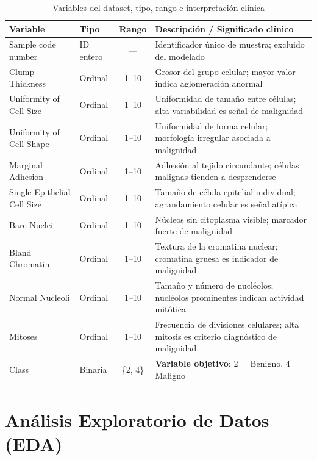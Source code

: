 \documentclass[11pt,a4paper]{article}
\begin{document}
\begin{table}[H]
\centering
\caption{Variables del dataset, tipo, rango e interpretación clínica}
\renewcommand{\arraystretch}{1.2}
\begin{tabularx}{\textwidth}{l l c X}
\toprule
\textbf{Variable} & \textbf{Tipo} & \textbf{Rango} & \textbf{Descripción / Significado clínico} \\
\midrule
\rowcolor{lightgray}
Sample code number & ID entero & --- & Identificador único de muestra; excluido del modelado \\
Clump Thickness & Ordinal & 1--10 & Grosor del grupo celular; mayor valor indica aglomeración anormal \\
\rowcolor{lightgray}
Uniformity of Cell Size & Ordinal & 1--10 & Uniformidad de tamaño entre células; alta variabilidad es señal de malignidad \\
Uniformity of Cell Shape & Ordinal & 1--10 & Uniformidad de forma celular; morfología irregular asociada a malignidad \\
\rowcolor{lightgray}
Marginal Adhesion & Ordinal & 1--10 & Adhesión al tejido circundante; células malignas tienden a desprenderse \\
Single Epithelial Cell Size & Ordinal & 1--10 & Tamaño de célula epitelial individual; agrandamiento celular es señal atípica \\
\rowcolor{lightgray}
Bare Nuclei & Ordinal & 1--10 & Núcleos sin citoplasma visible; marcador fuerte de malignidad \\
Bland Chromatin & Ordinal & 1--10 & Textura de la cromatina nuclear; cromatina gruesa es indicador de malignidad \\
\rowcolor{lightgray}
Normal Nucleoli & Ordinal & 1--10 & Tamaño y número de nucléolos; nucléolos prominentes indican actividad mitótica \\
Mitoses & Ordinal & 1--10 & Frecuencia de divisiones celulares; alta mitosis es criterio diagnóstico de malignidad \\
\rowcolor{lightgray}
Class & Binaria & \{2, 4\} & \textbf{Variable objetivo}: 2 = Benigno, 4 = Maligno \\
\bottomrule
\end{tabularx}
\end{table}

\section{Análisis Exploratorio de Datos (EDA)}
\end{document}
